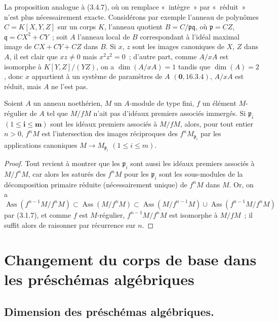 \begin{remark}[3.4.8]
\label{IV.2.3.4.8-fr}
La proposition analogue à (3.4.7), où on remplace «~intègre~» par
«~réduit~» n'est plus nécessairement exacte. Considérons par exemple l'anneau
de polynômes $C=K[X,Y,Z]$ sur un corps $K$, l'anneau quotient
$B=C/\mathfrak p\mathfrak q$, où $\mathfrak p=CZ$,
$\mathfrak q=CX^2+CY$~; soit $A$ l'anneau local de $B$ correspondant à l'idéal
maximal image de $CX+CY+CZ$ dans $B$. Si $x$, $z$ sont les images canoniques
de $X$, $Z$ dans $A$, il est clair que $xz\neq0$ mais $x^2z^2=0$~; d'autre
part, comme $A/xA$ est isomorphe à $K[Y,Z]/(YZ)$, on a
$\dim(A/xA)=1$ tandis que $\dim(A)=2$, donc $x$ appartient à un système de
paramètres de $A$ $(\mathbf{0},16.3.4)$, $A/xA$ est réduit, mais $A$ ne l'est pas.
\end{remark}

\begin{proposition}[3.4.9]
\label{IV.2.3.4.9-fr}
Soient $A$ un anneau noethérien, $M$ un $A$-module de type fini, $f$ un
élément $M$-régulier de $A$ tel que $M/fM$ n'ait pas d'idéaux premiers
associés immergés. Si $\mathfrak p_i$ $(1\leqslant\boldsymbol{i\leqslant m})$ sont les
idéaux premiers associés à $M/fM$, alors, pour tout entier $n>0$, $f^nM$ est
l'intersection des images réciproques des $f^nM_{\mathfrak p_i}$ par les
applications canoniques $M\to M_{\mathfrak p_i}$ $(1\leqslant i\leqslant m)$.
\end{proposition}

\begin{proof}
Tout revient à montrer que les $\mathfrak p_i$ sont aussi les idéaux premiers
associés à $M/f^nM$, car alors les saturés des $f^nM$ pour les
$\mathfrak p_i$ sont les sous-modules de la décomposition primaire réduite
(nécessairement unique) de $f^nM$ dans $M$. Or, on a
\[
\operatorname{Ass}(f^{n-1}M/f^nM)
\subset\operatorname{Ass}(M/f^nM)
\subset\operatorname{Ass}(M/f^{n-1}M)
\cup\operatorname{Ass}(f^{n-1}M/f^nM)
\]
par (3.1.7), et comme $f$ est $M$-régulier,
$f^{n-1}M/f^nM$ est isomorphe à $M/fM$~; il suffit alors de raisonner par
récurrence sur $n$.
\end{proof}

\section{Changement du corps de base dans les préschémas algébriques}
\label{IV.2.4-fr}

\subsection{Dimension des préschémas algébriques.}
\label{subsection:IV.2.4.1-fr}

